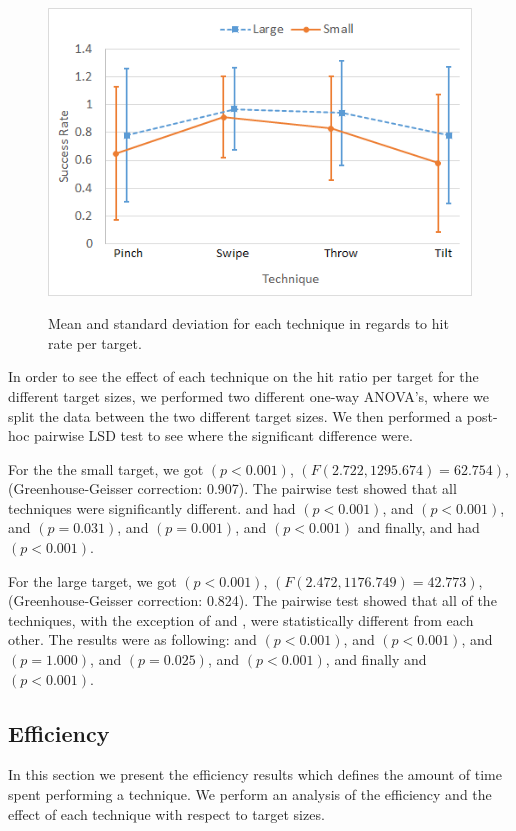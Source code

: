 \begin{figure}[H]
	{\includegraphics[width = 1\columnwidth ]{images/success.png}} 
	\caption{
		Mean and standard deviation for each technique in regards to hit rate per target.
	}
	\label{fig:successResults}
\end{figure}

In order to see the effect of each technique on the hit ratio per target for the different target sizes, we performed two different one-way ANOVA's, where we split the data between the two different target sizes.
We then performed a post-hoc pairwise LSD test to see where the significant difference were.
 
For the the small target, we got $(p<0.001)$, $(F(2.722, 1295.674)=62.754)$, (Greenhouse-Geisser correction: 0.907).
The pairwise test showed that all techniques were significantly different. \pinch and \swipe had $(p < 0.001)$, \pinch and \throw $(p <0.001)$, \pinch and \tilt $(p = 0.031)$, \swipe and \throw $(p=0.001)$, \swipe and \tilt $(p < 0.001)$ and finally, \throw and \tilt had $(p<0.001)$. 

For the large target, we got $(p<0.001)$, $(F(2.472, 1176.749)=42.773)$, (Greenhouse-Geisser correction: 0.824).
The pairwise test showed that all of the techniques, with the exception of \pinch and \tilt, were statistically different from each other. The results were as following: \pinch and \swipe $(p<0.001)$, \pinch and \throw $(p<0.001)$, \pinch and \tilt $(p=1.000)$, \swipe and \throw $(p=0.025)$, \swipe and \tilt $(p<0.001)$, and finally \throw and \tilt $(p<0.001)$.

\subsection{Efficiency}
In this section we present the efficiency results which defines the amount of time spent performing a technique.
We perform an analysis of the efficiency and the effect of each technique with respect to target sizes.

